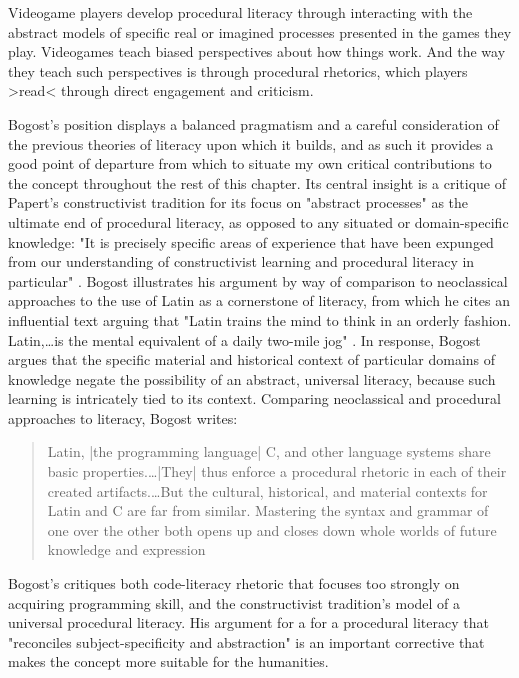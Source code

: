 \begin{quoting}
  Videogame players develop procedural literacy through interacting with the abstract models of specific real or imagined processes presented in the games they play. Videogames teach biased perspectives about how things work. And the way they teach such perspectives is through procedural rhetorics, which players >read< through direct engagement and criticism. \autocite[260]{Bogost2007-ow}
\end{quoting}
Bogost's position displays a balanced pragmatism and a careful consideration of the previous theories of literacy upon which it builds, and as such it provides a good point of departure from which to situate my own critical contributions to the concept throughout the rest of this chapter. Its central insight is a critique of Papert's constructivist tradition for its focus on "abstract processes" as the ultimate end of procedural literacy, as opposed to any situated or domain-specific knowledge: "It is precisely specific areas of experience that have been expunged from our understanding of constructivist learning and procedural literacy in particular" \autocite[250]{Bogost2007-ow}. Bogost illustrates his argument by way of comparison to neoclassical approaches to the use of Latin as a cornerstone of literacy, from which he cites an influential text arguing that "Latin trains the mind to think in an orderly fashion. Latin,…is the mental equivalent of a daily two-mile jog" \autocite[Wise and Bauer, qtd.~in][248]{Bogost2007-ow}. In response, Bogost argues that the specific material and historical context of particular domains of knowledge negate the possibility of an abstract, universal literacy, because such learning is intricately tied to its context. Comparing neoclassical and procedural approaches to literacy, Bogost writes:
\blockcquote[249]{Bogost2007-ow}{
  Latin, |the programming language| C, and other language systems share basic properties.…|They| thus enforce a procedural rhetoric in each of their created artifacts.…But the cultural, historical, and material contexts for Latin and C are far from similar. Mastering the syntax and grammar of one over the other both opens up and closes down whole worlds of future knowledge and expression
}
Bogost's critiques both code-literacy rhetoric that focuses too strongly on acquiring programming skill, and the constructivist tradition's model of a universal procedural literacy. His argument for a for a procedural literacy that "reconciles subject-specificity and abstraction" \autocite[244]{Bogost2007-ow} is an important corrective that makes the concept more suitable for the humanities.

